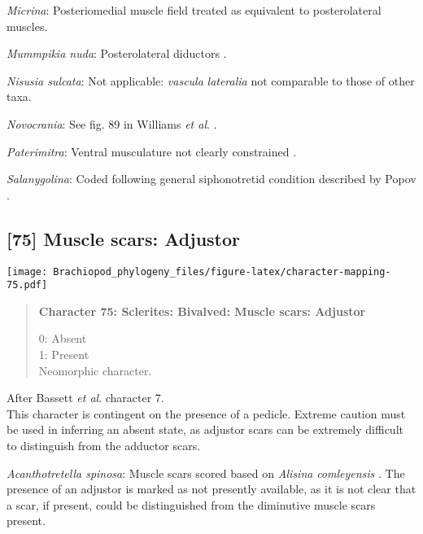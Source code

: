 \documentclass[openany]{book}
\theoremstyle{definition}
\theoremstyle{definition}
\theoremstyle{definition}
\theoremstyle{remark}
\begin{document}
\hypertarget{Micrina-coding-74}{}
\emph{Micrina}: Posteriomedial muscle field \citep[text-fig.
6]{Williams1998Thediversity} treated as equivalent to posterolateral
muscles.

\hypertarget{Mummpikia_nuda-coding-74}{}
\emph{Mummpikia nuda}: Posterolateral diductors \citep[fig. 18.2
in][]{Bassett2001Functionalmorphology}.

\hypertarget{Nisusia_sulcata-coding-74}{}
\emph{Nisusia sulcata}: Not applicable: \emph{vascula} \emph{lateralia}
not comparable to those of other taxa.

\hypertarget{Novocrania-coding-74}{}
\emph{Novocrania}: See fig. 89 in Williams \emph{et al}.
\citeyearpar{Williams2000LinguliformeaCraniiformea}.

\hypertarget{Paterimitra-coding-74}{}
\emph{Paterimitra}: Ventral musculature not clearly constrained
\citep{Holmer2009Theenigmatic}.

\hypertarget{Salanygolina-coding-74}{}
\emph{Salanygolina}: Coded following general siphonotretid condition
described by Popov \citeyearpar[p.~407]{Popov1992TheCambrian}.

\subsection*{{[}75{]} Muscle scars:
Adjustor}\label{muscle-scars-adjustor}

\texttt{[image: Brachiopod\_phylogeny\_files/figure-latex/character-mapping-75.pdf]}

\begin{quote}
\textbf{Character 75: Sclerites: Bivalved: Muscle scars: Adjustor}

0: Absent\\
1: Present\\
Neomorphic character.
\end{quote}

After Bassett \emph{et al}.
\citeyearpar{Bassett2001Functionalmorphology} character 7.\\
This character is contingent on the presence of a pedicle. Extreme
caution must be used in inferring an absent state, as adjustor scars can
be extremely difficult to distinguish from the adductor scars.

\hypertarget{Acanthotretella_spinosa-coding-75}{}
\emph{Acanthotretella spinosa}: Muscle scars scored based on
\emph{Alisina} \emph{comleyensis}
\citep{Bassett2001Functionalmorphology}. The presence of an adjustor is
marked as not presently available, as it is not clear that a scar, if
present, could be distinguished from the diminutive muscle scars
present.
\end{document}
